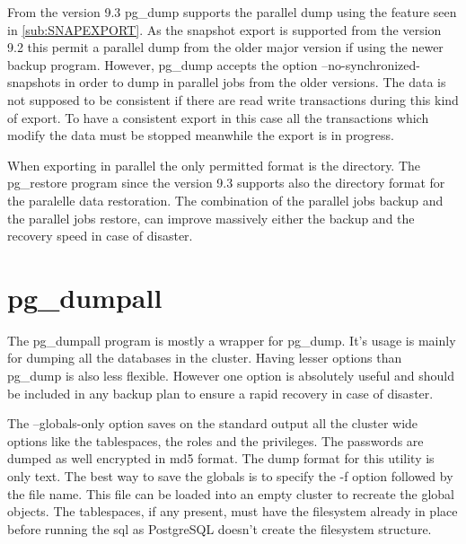 From the version 9.3 pg\_dump supports the parallel dump using the feature seen in  
\ref{sub:SNAPEXPORT}. As the snapshot export is supported from the version 9.2 this permit a 
parallel dump from the older major version if using the newer backup program. However, 
pg\_dump accepts the option --no-synchronized-snapshots in order to dump in parallel jobs 
from the older versions. The data is not supposed to be consistent if there are  read write 
transactions during this kind of export. To have a consistent export in this case all the 
transactions which modify the data must be stopped meanwhile the export is in progress.\newline 

When exporting in parallel the only permitted format is the directory. The pg\_restore program 
since the version 9.3 supports also the directory format for the paralelle data restoration.
The combination of the parallel jobs backup and the parallel jobs restore, can improve massively 
either the backup and the recovery speed in case of disaster.

\section{pg\_dumpall}
The pg\_dumpall program is mostly a wrapper for pg\_dump. It's usage is mainly for dumping all the 
databases in the cluster. Having lesser options than pg\_dump is also less flexible. However one 
option is absolutely useful and should be included in any backup plan to ensure a rapid recovery 
in case of disaster.\newline

The --globals-only option saves on the standard output all the cluster wide options like the 
tablespaces, the roles and the privileges. The passwords are dumped as well encrypted in md5 
format. The dump format for this utility is only text. The best way to save the globals is to 
specify the -f option followed by the file name. This file can be loaded into an empty cluster to 
recreate the global objects. The tablespaces, if any present, must have the filesystem already in 
place before running the sql as PostgreSQL doesn't create the filesystem structure.\newline

